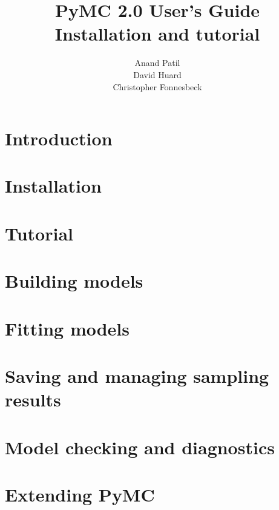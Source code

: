\documentclass[]{manual}
\title{PyMC 2.0 User's Guide \\
Installation and tutorial}
\author{Anand Patil \\ David Huard \\ Christopher Fonnesbeck}
\begin{document}
\maketitle

\tableofcontents
\linenumbers
\chapter{Introduction} 
\label{chap:intro} 


\chapter{Installation} 
\label{chap:install} 


\chapter{Tutorial}
\label{chap:tutorial}


\chapter{Building models}
\label{chap:modelbuilding} 


\chapter{Fitting models}
\label{chap:modelfitting}


\chapter{Saving and managing sampling results}
\label{chap:database} 


\chapter{Model checking and diagnostics} 
\label{chap:modelchecking}


\chapter{Extending PyMC}
\label{chap:extending}

\end{document}
